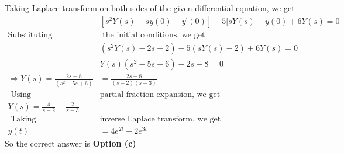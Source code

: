 \begin{enumerate}
\begin{answer}
	Taking Laplace transform on both sides of the given differential equation, we get
	$$
	\begin{aligned}
	&\left[s^{2} Y(s)-s y(0)-y^{\prime}(0)\right]-5[s Y(s)-y(0)+6 Y(s)=0\\
	\text{Substituting}&\text{ the initial conditions, we get }\\
	&\left(s^{2} Y(s)-2 s-2\right)-5(s Y(s)-2)+6 Y(s)=0\\
&	Y(s)\left(s^{2}-5 s+6\right)-2 s+8=0\\
\Rightarrow Y(s)=\frac{2 s-8}{\left(s^{2}-5 s+6\right)}&=\frac{2 s-8}{(s-2)(s-3)}\\
\text{ Using  }&\text{partial fraction expansion, we get}\\
Y(s)=\frac{4}{s-2}-\frac{2}{s-3}\\
\text { Taking }&\text{inverse Laplace transform, we get }\\
y(t)&=4 e^{2 t}-2 e^{3 t}
\end{aligned}
$$
	So the correct answer is \textbf{Option (c)}
\end{answer}
	
	
	
	
	
	
	
	
	
	
	
\end{enumerate}